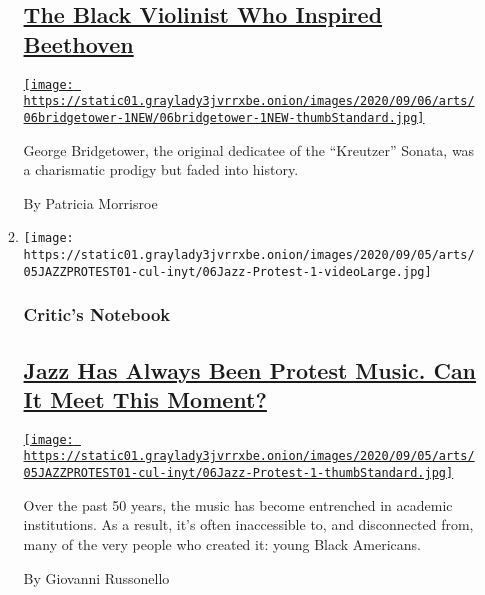 \begin{enumerate}
\begin{enumerate}
    \hypertarget{the-black-violinist-who-inspired-beethoven}{%
    \subsection{\texorpdfstring{\href{/2020/09/04/arts/music/george-bridgetower-violin.html}{The
    Black Violinist Who Inspired
    Beethoven}}{The Black Violinist Who Inspired Beethoven}}\label{the-black-violinist-who-inspired-beethoven}}

    \href{/2020/09/04/arts/music/george-bridgetower-violin.html}{\texttt{[image: https://static01.graylady3jvrrxbe.onion/images/2020/09/06/arts/06bridgetower-1NEW/06bridgetower-1NEW-thumbStandard.jpg]}}

    George Bridgetower, the original dedicatee of the ``Kreutzer''
    Sonata, was a charismatic prodigy but faded into history.

    By Patricia Morrisroe
  \item
    \texttt{[image: https://static01.graylady3jvrrxbe.onion/images/2020/09/05/arts/05JAZZPROTEST01-cul-inyt/06Jazz-Protest-1-videoLarge.jpg]}

    \hypertarget{critics-notebook}{%
    \subsubsection{Critic's Notebook}\label{critics-notebook}}

    \hypertarget{jazz-has-always-been-protest-music-can-it-meet-this-moment}{%
    \subsection{\texorpdfstring{\href{/2020/09/03/arts/music/jazz-protest-academia.html}{Jazz
    Has Always Been Protest Music. Can It Meet This
    Moment?}}{Jazz Has Always Been Protest Music. Can It Meet This Moment?}}\label{jazz-has-always-been-protest-music-can-it-meet-this-moment}}

    \href{/2020/09/03/arts/music/jazz-protest-academia.html}{\texttt{[image: https://static01.graylady3jvrrxbe.onion/images/2020/09/05/arts/05JAZZPROTEST01-cul-inyt/06Jazz-Protest-1-thumbStandard.jpg]}}

    Over the past 50 years, the music has become entrenched in academic
    institutions. As a result, it's often inaccessible to, and
    disconnected from, many of the very people who created it: young
    Black Americans.

    By Giovanni Russonello
  \end{enumerate}
\end{enumerate}

